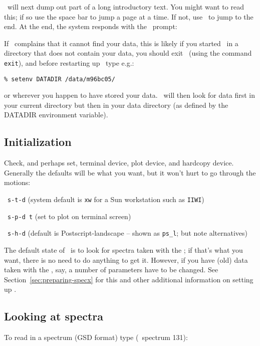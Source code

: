\SPECX\ will next dump out part of a long introductory
text. You might want to read this; if so use the space bar to jump a
page at a time. If not, use \ctrlc\ to jump to the end. At the end,
the system responds with the \SPECX\ prompt:

\SP

\aside
If \SPECX\ complains that it cannot find your data, this is likely
if you started \SPECX\ in a directory that does not contain your data, 
you
should exit \SPECX\ (using the command {\tt{exit}}), and before
restarting up \SPECX\ type e.g.:

\verb|% setenv DATADIR /data/m96bc05/|

or wherever you happen to have stored your data. \SPECX\ will then 
look for data first in your current directory but then in your data 
directory (as defined by the DATADIR environment variable).

\myline
 
\subsection{Initialization}
\label{sec:specx-init}
Check, and perhaps set, terminal device,
plot device, and hardcopy device. Generally the defaults will be what
you want, but it won't hurt to go through the motions:

\SP\ {\tt{s-t-d}} \hspace*{0.5in}(system default is {\tt{xw}} for a 
Sun workstation such as {\tt{IIWI}})

\SP\ {\tt{s-p-d t}} \hspace*{0.35in}(set to plot on terminal screen)

\SP\ {\tt{s-h-d}} \hspace*{0.5in}(default is Postscript-landscape --
shown as {\verb|ps_l|}; but note alternatives)

The default state of \SPECX\ is to look for spectra taken with the
\das ; if that's what you want, there is no need to do anything to get
it. However, if you have (old) data taken with the \aosc , say, a
number of parameters have to be changed. See
Section~\ref{sec:preparing-specx} for this and other additional
information on setting up \SPECX .

\normalmarginpar
\subsection{Looking at spectra}
To read in a spectrum (GSD format) type
(\eg\ spectrum 131):

